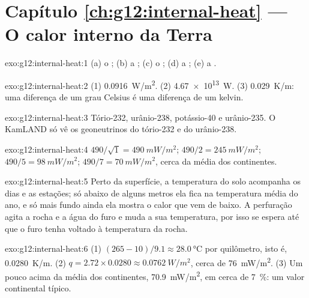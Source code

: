 \section*{Capítulo \ref{ch:g12:internal-heat} --- O calor interno da Terra}

\begin{solution}{exo:g12:internal-heat:1}
(a) o ; (b) a ; (c) o
; (d) a ; (e) a .
\end{solution}

\begin{solution}{exo:g12:internal-heat:2}
(1) \qty{0.0916}{W/m^2}. (2) \qty{4.67e13}{W}. (3) \qty{0.029}{K/m}: uma
diferença de um grau Celsius é uma diferença de um kelvin.
\end{solution}

\begin{solution}{exo:g12:internal-heat:3}
Tório-232, urânio-238, potássio-40 e urânio-235. O KamLAND só vê os
geoneutrinos do tório-232 e do urânio-238.
\end{solution}

\begin{solution}{exo:g12:internal-heat:4}
$490/\sqrt{1} = \qty{490}{mW/m^2}$; $490/2 = \qty{245}{mW/m^2}$;
$490/5 = \qty{98}{mW/m^2}$; $490/7 = \qty{70}{mW/m^2}$, cerca da média dos
continentes.
\end{solution}

\begin{solution}{exo:g12:internal-heat:5}
Perto da superfície, a temperatura do solo acompanha os dias e as estações;
só abaixo de alguns metros ela fica na temperatura média do ano, e só mais
fundo ainda ela mostra o calor que vem de baixo. A perfuração agita a rocha
e a água do furo e muda a sua temperatura, por isso se espera até que o
furo tenha voltado à temperatura da rocha.
\end{solution}

\begin{solution}{exo:g12:internal-heat:6}
(1) $(265 - 10)/9.1 \approx \qty{28.0}{\celsius}$ por quilômetro, isto é,
\qty{0.0280}{K/m}. (2) $q = 2.72 \times 0.0280 \approx \qty{0.0762}{W/m^2}$,
cerca de \qty{76}{mW/m^2}. (3) Um pouco acima da média dos continentes,
\qty{70.9}{mW/m^2}, em cerca de \qty{7}{\percent}: um valor continental
típico.
\end{solution}

